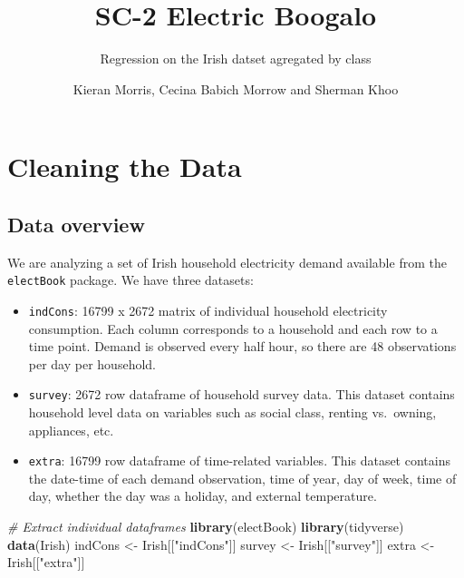 \documentclass[
]{article}
\title{SC-2 Electric Boogalo}
\subtitle{Regression on the Irish datset agregated by class}
\author{Kieran Morris, Cecina Babich Morrow and Sherman Khoo}
\date{}
\newenvironment{Shaded}{\begin{snugshade}}{\end{snugshade}}
\newcommand{\CommentTok}[1]{\textcolor[rgb]{0.56,0.35,0.01}{\textit{#1}}}
\newcommand{\FunctionTok}[1]{\textcolor[rgb]{0.13,0.29,0.53}{\textbf{#1}}}
\newcommand{\NormalTok}[1]{#1}
\newcommand{\OtherTok}[1]{\textcolor[rgb]{0.56,0.35,0.01}{#1}}
\newcommand{\StringTok}[1]{\textcolor[rgb]{0.31,0.60,0.02}{#1}}
\providecommand{\tightlist}{%
  \setlength{\itemsep}{0pt}\setlength{\parskip}{0pt}}
\begin{document}
\maketitle

{
\hypersetup{linkcolor=}
\setcounter{tocdepth}{3}
\tableofcontents
}
\hypertarget{cleaning-the-data}{%
\section{Cleaning the Data}\label{cleaning-the-data}}

\hypertarget{data-overview}{%
\subsection{Data overview}\label{data-overview}}

We are analyzing a set of Irish household electricity demand available
from the \texttt{electBook} package. We have three datasets:

\begin{itemize}
\tightlist
\item
  \texttt{indCons}: 16799 x 2672 matrix of individual household
  electricity consumption. Each column corresponds to a household and
  each row to a time point. Demand is observed every half hour, so there
  are 48 observations per day per household.
\item
  \texttt{survey}: 2672 row dataframe of household survey data. This
  dataset contains household level data on variables such as social
  class, renting vs.~owning, appliances, etc.
\item
  \texttt{extra}: 16799 row dataframe of time-related variables. This
  dataset contains the date-time of each demand observation, time of
  year, day of week, time of day, whether the day was a holiday, and
  external temperature.
\end{itemize}

\begin{Shaded}
\begin{Highlighting}[]
\CommentTok{\# Extract individual dataframes}
\FunctionTok{library}\NormalTok{(electBook)}
\FunctionTok{library}\NormalTok{(tidyverse)}
\FunctionTok{data}\NormalTok{(Irish)}
\NormalTok{indCons }\OtherTok{\textless{}{-}}\NormalTok{ Irish[[}\StringTok{"indCons"}\NormalTok{]]}
\NormalTok{survey }\OtherTok{\textless{}{-}}\NormalTok{ Irish[[}\StringTok{"survey"}\NormalTok{]]}
\NormalTok{extra }\OtherTok{\textless{}{-}}\NormalTok{ Irish[[}\StringTok{"extra"}\NormalTok{]]}
\end{Highlighting}
\end{Shaded}
\end{document}
